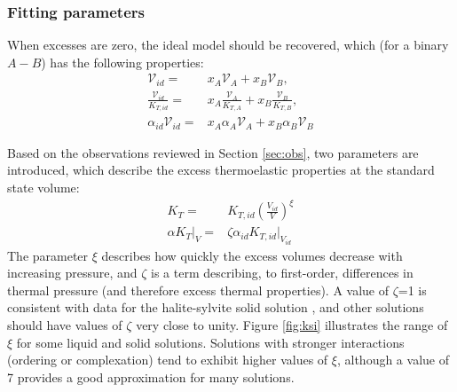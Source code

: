 \subsubsection{Fitting parameters}
When excesses are zero, the ideal model should be recovered, which (for a binary $A-B$) has the following properties:
\begin{eqnarray}
\mathcal{V}_{id} =& x_A\mathcal{V}_A + x_B\mathcal{V}_B,\label{eqn:ideal_volume} \\
\frac{\mathcal{V}_{id}}{K_{T, id}} =& x_A\frac{\mathcal{V}_{A}}{K_{T, A}} + x_B\frac{\mathcal{V}_{B}}{K_{T, B}}, \\
\alpha_{id} \mathcal{V}_{id} =& x_A\alpha_A \mathcal{V}_A + x_B\alpha_B \mathcal{V}_B 
\end{eqnarray}

Based on the observations reviewed in Section \ref{sec:obs}, two parameters are introduced, which describe the excess thermoelastic properties at the standard state volume:
\begin{eqnarray}
K_T =& K_{T, id} \left(\frac{V_{id}}{V}\right)^{\xi} \label{eqn:KV_relation} \\
\alpha K_T |_{V} =& \zeta \alpha_{id} K_{T, id} |_{V_{id}}
\end{eqnarray}
\noindent The parameter $\xi$ describes how quickly the excess volumes decrease with increasing pressure, and $\zeta$ is a term describing, to first-order, differences in thermal pressure (and therefore excess thermal properties). A value of $\zeta$=1 is consistent with data for the halite-sylvite solid solution \citep{WVCJCB2004, WVCCJB2005}, and other solutions should have values of $\zeta$ very close to unity. Figure \ref{fig:ksi} illustrates the range of $\xi$ for some liquid and solid solutions. Solutions with stronger interactions (ordering or complexation) tend to exhibit higher values of $\xi$, although a value of 7 provides a good approximation for many solutions. 


